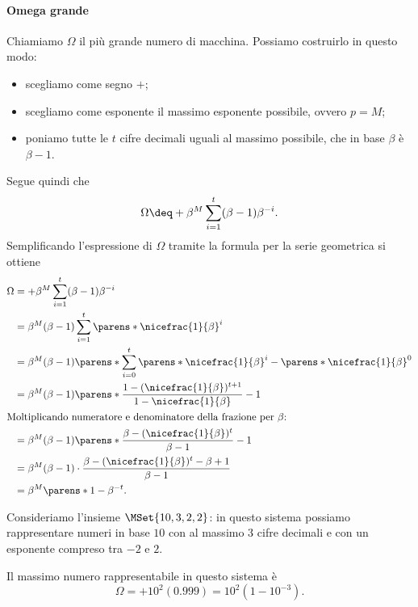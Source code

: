 \paragraph{Omega grande} Chiamiamo $\Omega$ il più grande numero di macchina. Possiamo costruirlo in questo modo: \begin{itemize}
    \item scegliamo come segno $+$;
    \item scegliamo come esponente il massimo esponente possibile, ovvero $p = M$;
    \item poniamo tutte le $t$ cifre decimali uguali al massimo possibile, che in base $\beta$ è $\beta-1$. 
\end{itemize} Segue quindi che \[
    \Omega \deq +\beta^M\sum_{i=1}^t (\beta-1)\beta^{-i}.
\] Semplificando l'espressione di $\Omega$ tramite la formula per la serie geometrica si ottiene \begin{align*}
    \Omega &= +\beta^M\sum_{i=1}^t (\beta-1)\beta^{-i}\\
    &= \beta^M(\beta - 1) \sum_{i=1}^t \parens*{\nicefrac{1}{\beta}}^i \\
    &= \beta^M(\beta - 1) \parens*{\sum_{i=0}^t \parens*{\nicefrac{1}{\beta}}^i - \parens*{\nicefrac{1}{\beta}}^0}\\
    &= \beta^M(\beta - 1) \parens*{\frac{1 - (\nicefrac{1}{\beta})^{t+1}}{1 - \nicefrac{1}{\beta}} - 1}\\
    \intertext{Moltiplicando numeratore e denominatore della frazione per $\beta$:}
    &= \beta^M(\beta - 1) \parens*{\frac{\beta - (\nicefrac{1}{\beta})^{t}}{\beta - 1} - 1}\\
    &= \beta^M(\beta - 1) \cdot \frac{\beta - (\nicefrac{1}{\beta})^{t} - \beta + 1}{\beta - 1}\\
    &= \beta^M \parens*{1 - \beta^{-t}}.
\end{align*}

\begin{example}
    Consideriamo l'insieme $\MSet{10, 3, 2, 2}$: in questo sistema possiamo rappresentare numeri in base $10$ con al massimo $3$ cifre decimali e con un esponente compreso tra $-2$ e $2$. 
    
    Il massimo numero rappresentabile in questo sistema è \[
        \Omega = +10^2(0.999) = 10^2 (1 - 10^{-3}).
    \]
\end{example}

